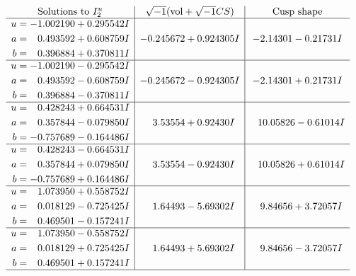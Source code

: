 \documentclass[1p]{elsarticle_modified}
\theoremstyle{definition}
\newcommand{\I}{\sqrt{-1}}
\begin{document}
$$\begin{array}{c|c|c}  
\text{Solutions to }I^u_{2}& \I (\text{vol} + \sqrt{-1}CS) & \text{Cusp shape}\\
 \hline 
\begin{aligned}
u &= -1.002190 + 0.295542 I \\
a &= \phantom{-}0.493592 + 0.608759 I \\
b &= \phantom{-}0.396884 + 0.370811 I\end{aligned}
 & -0.245672 + 0.924305 I & -2.14301 - 0.21731 I \\ \hline\begin{aligned}
u &= -1.002190 - 0.295542 I \\
a &= \phantom{-}0.493592 - 0.608759 I \\
b &= \phantom{-}0.396884 - 0.370811 I\end{aligned}
 & -0.245672 - 0.924305 I & -2.14301 + 0.21731 I \\ \hline\begin{aligned}
u &= \phantom{-}0.428243 + 0.664531 I \\
a &= \phantom{-}0.357844 - 0.079850 I \\
b &= -0.757689 - 0.164486 I\end{aligned}
 & \phantom{-}3.53554 + 0.92430 I & \phantom{-}10.05826 - 0.61014 I \\ \hline\begin{aligned}
u &= \phantom{-}0.428243 - 0.664531 I \\
a &= \phantom{-}0.357844 + 0.079850 I \\
b &= -0.757689 + 0.164486 I\end{aligned}
 & \phantom{-}3.53554 - 0.92430 I & \phantom{-}10.05826 + 0.61014 I \\ \hline\begin{aligned}
u &= \phantom{-}1.073950 + 0.558752 I \\
a &= \phantom{-}0.018129 - 0.725425 I \\
b &= \phantom{-}0.469501 - 0.157241 I\end{aligned}
 & \phantom{-}1.64493 - 5.69302 I & \phantom{-}9.84656 + 3.72057 I \\ \hline\begin{aligned}
u &= \phantom{-}1.073950 - 0.558752 I \\
a &= \phantom{-}0.018129 + 0.725425 I \\
b &= \phantom{-}0.469501 + 0.157241 I\end{aligned}
 & \phantom{-}1.64493 + 5.69302 I & \phantom{-}9.84656 - 3.72057 I\\
 \hline 
 \end{array}$$\newpage
\end{document}
